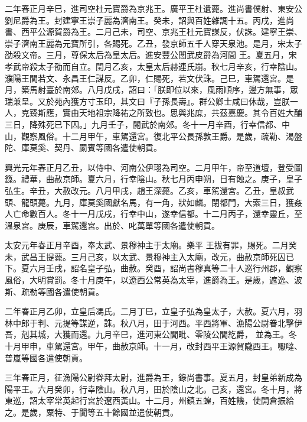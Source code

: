 \begin{pinyinscope}
 二年春正月辛巳，進司空杜元寶爵為京兆王。廣平王杜遺薨。進尚書僕射、東安公劉尼爵為王。封建寧王崇子麗為濟南王。癸未，詔與百姓雜調十五。丙戌，進尚書、西平公源賀爵為王。二月己未，司空、京兆王杜元寶謀反，伏誅。建寧王崇、崇子濟南王麗為元寶所引，各賜死。乙丑，發京師五千人穿天泉池。是月，宋太子劭殺文帝。三月，尊保太后為皇太后。進安豐公閭武皮爵為河間
 王。夏五月，宋孝武帝殺太子劭而自立。閏月乙亥，太皇太后赫連氏崩。秋七月辛亥，行幸陰山。濮陽王閭若文、永昌王仁謀反。乙卯，仁賜死，若文伏誅。己巳，車駕還宮。是月，築馬射臺於南郊。八月戊戌，詔曰：「朕即位以來，風雨順序，邊方無事，眾瑞兼呈。又於苑內獲方寸玉印，其文曰『子孫長壽』。群公卿士咸曰休哉，豈朕一人，克臻斯應，實由天地祖宗降祐之所致也。思與兆庶，共茲嘉慶。其令百姓大酺三日，降殊死已下囚。」九月壬子，閱武於南郊。冬十一月辛酉，行幸信都、中山，觀察風俗。十二月甲午，車駕還宮。復北平公長孫敦王爵。是歲，疏勒、渴盤
 陀、庫莫奚、契丹、罽賓等國各遣使朝貢。



 興光元年春正月乙丑，以侍中、河南公伊珝為司空。二月甲午，帝至道壇，登受圖籙。禮華，曲赦京師。夏六月，行幸陰山。秋七月丙申朔，日有蝕之。庚子，皇子弘生。辛丑，大赦改元。八月甲戌，趙王深薨。乙亥，車駕還宮。乙丑，皇叔武頭、龍頭薨。九月，庫莫奚國獻名馬，有一角，狀如麟。閉都門，大索三日，獲姦人亡命數百人。冬十一月戊戌，行幸中山，遂幸信都。十二月丙子，還幸靈丘，至溫泉宮。庚辰，車駕還宮。出於、叱萬單等國各遣使朝貢。



 太安元年春正月辛酉，奉太武、景穆神主于太廟。樂平
 王拔有罪，賜死。二月癸未，武昌王提薨。三月己亥，以太武、景穆神主入太廟，改元，曲赦京師死囚已下。夏六月壬戌，詔名皇子弘，曲赦。癸酉，詔尚書穆真等二十人巡行州郡，觀察風俗，大明賞罰。冬十月庚午，以遼西公常英為太宰，進爵為王。是歲，遮逸、波斯、疏勒等國各遣使朝貢。



 二年春正月乙卯，立皇后馮氏。二月丁巳，立皇子弘為皇太子，大赦。夏六月，羽林中郎于判、元提等謀逆，誅。秋八月，田于河西。平西將軍、漁陽公尉眷北擊伊吾，剋其城，大獲而還。九月辛巳，進河東公閭毗、零陵公閭紇爵，
 並為王。冬十月甲申，車駕還宮。甲午，曲赦京師。十一月，改封西平王源賀隴西王。嚈噠、普嵐等國各遣使朝貢。



 三年春正月，征漁陽公尉眷拜太尉，進爵為王，錄尚書事。夏五月，封皇弟新成為陽平王。六月癸卯，行幸陰山。秋八月，田於陰山之北。己亥，還宮。冬十月，將東巡，詔太宰常英起行宮於遼西黃山。十二月，州鎮五蝗，百姓饑，使開倉振給之。是歲，粟特、于闐等五十餘國並遣使朝貢。




\end{pinyinscope}
